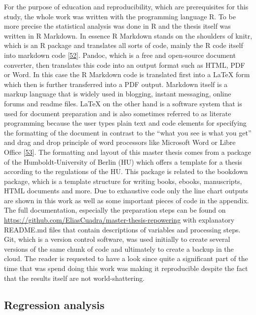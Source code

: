 \documentclass[a4paper,11pt]{article}
\begin{document}
For the purpose of education and reproducibility, which are prerequisites for this study, the whole work was written with the programming language R. To be more precise the statistical analysis was done in R and the thesis itself was written in R Markdown. In essence R Markdown stands on the shoulders of knitr, which is an R package and translates all sorts of code, mainly the R code itself into markdown code {[}\protect\hyperlink{ref-YihuiXieJ.J.AllaireGarrettGrolemund.2021}{52}{]}. Pandoc, which is a free and open-source document converter, then translates this code into an output format such as HTML, PDF or Word. In this case the R Markdown code is translated first into a LaTeX form which then is further transferred into a PDF output. Markdown itself is a markup language that is widely used in blogging, instant messaging, online forums and readme files. LaTeX on the other hand is a software system that is used for document preparation and is also sometimes referred to as literate programming because the user types plain text and code elements for specifying the formatting of the document in contrast to the ``what you see is what you get'' and drag and drop principle of word processors like Microsoft Word or Libre Office {[}\protect\hyperlink{ref-LaTeX.2021}{53}{]}. The formatting and layout of this master thesis comes from a package of the Humboldt-University of Berlin (HU) which offers a template for a thesis according to the regulations of the HU. This package is related to the bookdown package, which is a template structure for writing books, ebooks, manuscripts, HTML documents and more. Due to exhaustive code only the line chart outputs are shown in this work as well as some important pieces of code in the appendix. The full documentation, especially the preparation steps can be found on \url{https://github.com/EliasCuadra/master-thesis-repowering} with explanatory README.md files that contain descriptions of variables and processing steps. Git, which is a version control software, was used initially to create several versions of the same chunk of code and ultimately to create a backup in the cloud. The reader is requested to have a look since quite a significant part of the time that was spend doing this work was making it reproducible despite the fact that the results itself are not world-shattering.

\hypertarget{regression-analysis}{%
\subsection{Regression analysis}\label{regression-analysis}}
\end{document}
